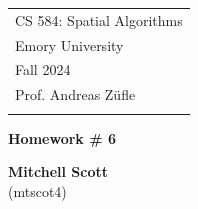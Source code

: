 \documentclass[a4paper,12pt]{article}
\theoremstyle{definition}
\theoremstyle{remark}
\begin{document}
	
	
	
	
	
	\thispagestyle{empty} %
	
	\begin{tabular}{p{15.5cm}} %
		{\large \sc CS 584:  Spatial Algorithms} \\
		Emory University \\ Fall 2024 \\ Prof. Andreas Z\"ufle\\
		\hline %
		\\
	\end{tabular} %
	
	\vspace*{0.3cm} %
	
	\begin{center} %
		{\Large \bf Homework \# 6} %
		\vspace{2mm}
		
		{\bf Mitchell Scott}\\ (mtscot4) %
		
	\end{center}  
	
	\vspace{0.4cm}
	
	
	
\end{document}
